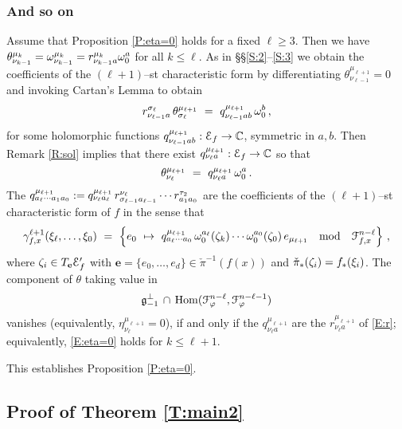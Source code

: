 \documentclass[12pt]{amsart}
\numberwithin{equation}{section}
\numberwithin{table}{section}
\numberwithin{figure}{section}
\begin{document}
\subsubsection{And so on} \label{S:k}

Assume that Proposition \ref{P:eta=0} holds for a fixed $\ell \ge 3$.  Then we have $\theta^{\mu_k}_{\nu_{k-1}} = \omega^{\mu_k}_{\nu_{k-1}} = r^{\mu_k}_{\nu_{k-1}a} \omega^a_0$ for all $k \le \ell$.   As in \S\S\ref{S:2}--\ref{S:3} we obtain the coefficients of the $(\ell+1)$--st characteristic form by differentiating $\theta^{\mu_{\ell+1}}_{\nu_{\ell-1}}=0$  and invoking Cartan's Lemma to obtain
\[
  r^{\s_\ell}_{\nu_{\ell-1}a} \, \theta^{\mu_{\ell+1}}_{\s_\ell} \ = \ 
  q^{\mu_{\ell+1}}_{\nu_{\ell-1}ab} \, \w^b_0 \,,
\]
for some holomorphic functions $q^{\mu_{\ell+1}}_{\nu_{\ell-1}ab} : \mathcal E_f \to \mathbb C$, symmetric in $a,b$.  Then Remark \ref{R:sol} implies that there exist $q^{\mu_{\ell+1}}_{\nu_\ell a} : \mathcal E_f \to \mathbb C$ so that 
\[
  \theta^{\mu_{\ell+1}}_{\nu_\ell} \ = \ 
  q^{\mu_{\ell+1}}_{\nu_\ell a} \, \w^a_0 \,.
\]
The $q^{\mu_{\ell+1}}_{a_\ell\cdots a_1 a_0} := q^{\mu_{\ell+1}}_{\nu_\ell a_\ell} \, r^{\nu_\ell}_{\sigma_{\ell-1} a_{\ell-1}} \cdots r^{\tau_2}_{a_1 a_0}$ are the coefficients of the $(\ell+1)$--st characteristic form of $f$ in the sense that 
\begin{equation} \label{E:cf'}
  \gamma^{\ell+1}_{f,x}(\xi_\ell,\ldots,\xi_0) \ = \ 
  \left\{ e_0 \ \mapsto \ q^{\m_{\ell+1}}_{a_\ell\cdots a_0} \,
  \w^{a_\ell}_0(\z_k) \cdots \w^{a_0}_0(\z_0) \, e_{\m_{\ell+1}} 
  \quad\hbox{mod}\quad \cF_{f,x}^{n-\ell} \right\} \,,
\end{equation}
where $\zeta_i \in T_\mathbf{e} \mathcal E'_f$ with $\mathbf{e} = \{ e_0 , \ldots , e_d\} \in \check\pi^{-1}(f(x))$ and $\check\pi_*(\zeta_i) = f_*(\xi_i)$.  The component of $\theta$ taking value in
\[
  {\mathfrak{g}}^\perp_{-1} \,\cap\, \mathrm{Hom}(\mathcal F^{n-\ell}_\varphi,\mathcal F^{n-\ell-1}_\varphi)
\]
vanishes (equivalently, $\eta^{\mu_{\ell+1}}_{\nu_\ell}=0$), if and only if the $q^{\mu_{\ell+1}}_{\nu_\ell a}$ are the $r^{\mu_{\ell+1}}_{\nu_\ell a}$ of \eqref{E:r}; equivalently, \eqref{E:eta=0} holds for $k \le \ell+1$.

This establishes Proposition \ref{P:eta=0}.

\subsection{Proof of Theorem \ref{T:main2}} \label{S:prf2}
\end{document}
